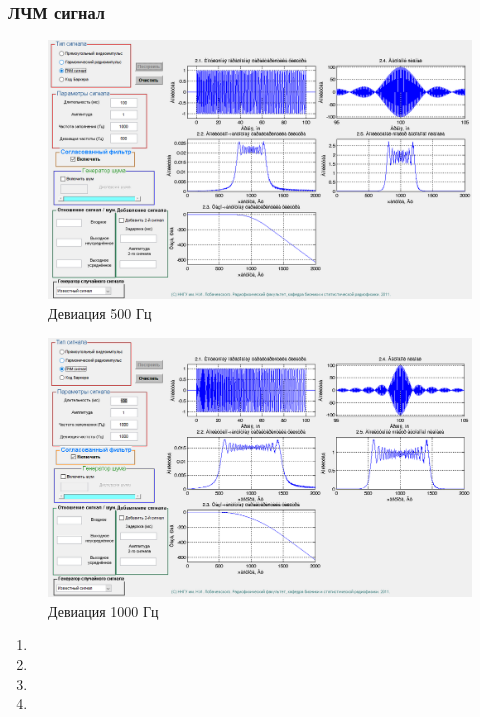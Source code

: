 \subsubsection{ЛЧМ сигнал}
\begin{figure}[H]
    \centering
    \includegraphics[width=0.9\linewidth]{imgs/task_2/t2s3_500.png}
    \caption{Девиация 500 Гц}
    \label{fig:task_2_3_500}
\end{figure}
\begin{figure}[H]
    \centering
    \includegraphics[width=0.9\linewidth]{imgs/task_2/t2s3_1000.png}
    \caption{Девиация 1000 Гц}
    \label{fig:task_2_3_1000}
\end{figure}

\begin{enumerate}
    \item 
    \item 
    \item 
    \item 
\end{enumerate}


